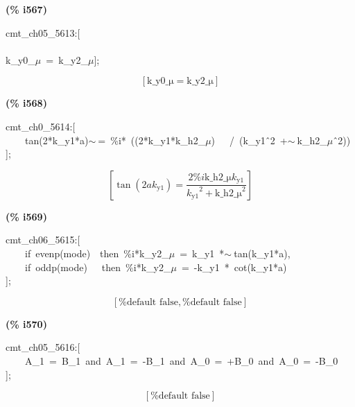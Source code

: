 \documentclass[fleqn]{article}
\begin{document}
\noindent
\begin{minipage}[t]{4.000000em}\color{red}\bfseries
(\% i567)	
\end{minipage}
\begin{minipage}[t]{\textwidth}\color{blue}
cmt\_ch05\_5613:[\\
\\
k\_y0\_\ensuremath{\mu}\ =\ k\_y2\_\ensuremath{\mu}];
\end{minipage}
\[\displaystyle \tag{\% o567} 
\left[ \ensuremath{\mathrm{k\_ y0\_ \mu }}=\ensuremath{\mathrm{k\_ y2\_ \mu }}\right] \mbox{}
\]


\noindent
\begin{minipage}[t]{4.000000em}\color{red}\bfseries
(\% i568)	
\end{minipage}
\begin{minipage}[t]{\textwidth}\color{blue}
cmt\_ch0\_5614:[\\
\ \ \ \ tan(2*k\_y1*a)\ensuremath{\sim\ }=\ \%i*\ ((2*k\_y1*k\_h2\_\ensuremath{\mu})\ \ \ /\ (k\_y1\^\ 2\ +\ensuremath{\sim\ }k\_h2\_\ensuremath{\mu}\^\ 2))\\
];
\end{minipage}
\[\displaystyle \tag{\% o568} 
\left[ \tan{\left( 2 a {k_{\ensuremath{\mathrm{y1}}}}\right) }=\frac{2 \% i \ensuremath{\mathrm{k\_ h2\_ \mu }} {k_{\ensuremath{\mathrm{y1}}}}}{{{{k_{\ensuremath{\mathrm{y1}}}}}^{2}}+{{\ensuremath{\mathrm{k\_ h2\_ \mu }}}^{2}}}\right] \mbox{}
\]


\noindent
\begin{minipage}[t]{4.000000em}\color{red}\bfseries
(\% i569)	
\end{minipage}
\begin{minipage}[t]{\textwidth}\color{blue}
cmt\_ch06\_5615:[\\
\ \ \ \ if\ evenp(mode)\ \ then\ \%i*k\_y2\_\ensuremath{\mu}\ =\ k\_y1\ *\ensuremath{\sim\ }tan(k\_y1*a),\\
\ \ \ \ if\ oddp(mode)\ \ \ then\ \%i*k\_y2\_\ensuremath{\mu}\ =\ -k\_y1\ *\ cot(k\_y1*a)\\
];
\end{minipage}
\[\displaystyle \tag{\% o569} 
\left[ \mbox{%
false}\operatorname{,}\mbox{%
false}\right] \mbox{}
\]


\noindent
\begin{minipage}[t]{4.000000em}\color{red}\bfseries
(\% i570)	
\end{minipage}
\begin{minipage}[t]{\textwidth}\color{blue}
cmt\_ch05\_5616:[\\
\ \ \ \ A\_1\ =\ B\_1\ and\ A\_1\ =\ -B\_1\ and\ A\_0\ =\ +B\_0\ and\ A\_0\ =\ -B\_0\\
];
\end{minipage}
\[\displaystyle \tag{\% o570} 
\left[ \mbox{%
false}\right] \mbox{}
\]
\end{document}
